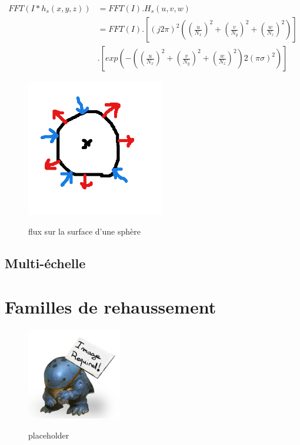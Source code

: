 {\begin{align}
  FFT( I * h_s(x,y,z) ) &= FFT(I) . H_s(u,v,w) \\
                       &= FFT(I) . [ (j2 \pi)^2 ( (\frac{u}{N_x})^2 + (\frac{v}{N_y})^2 + (\frac{w}{N_z})^2 ) ] \\
                       & . [ exp( -( (\frac{u}{N_x})^2 + (\frac{v}{N_y})^2 + (\frac{w}{N_z})^2 ) 2(\pi\sigma)^2 ) ]
\end{align}

\begin{figure}
  \centering
  \includegraphics[height=6cm]{Images/flux.png}
  \label{fig:flux_sphere}
  \caption{flux sur la surface d'une sphère}
\end{figure}

\subsection{Multi-échelle}
\label{sec:EA:rehaussement:echelle:multiScale}



\section{Familles de rehaussement}
\label{sec:EA:rehaussement:famille}

\begin{figure}
  \centering
  \includegraphics[height=4cm]{Images/img_required.jpg}
  \label{fig:placeholder}
  \caption{placeholder}
\end{figure}

}
